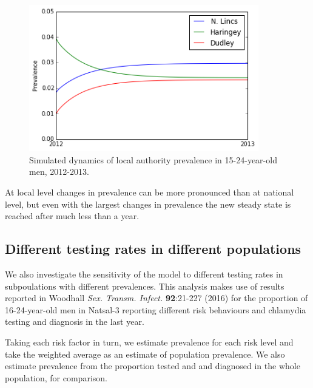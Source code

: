 \documentclass{article}
\begin{document}
    \begin{figure}
        \begin{center}\includegraphics[width=10cm]{three_compartment_model_files/three_compartment_model_22_1.png}\end{center}
        \caption{Simulated dynamics of local authority prevalence in 15-24-year-old men, 2012-2013.}
        \label{}
    \end{figure}
    
    At local level changes in prevalence can be more pronounced than at
national level, but even with the largest changes in prevalence the new
steady state is reached after much less than a year.

\subsection{Different testing rates in different
populations}\label{different-testing-rates-in-different-populations}

We also investigate the sensitivity of the model to different testing
rates in subpoulations with different prevalences. This analysis makes
use of results reported in Woodhall \emph{Sex. Transm. Infect.}
\textbf{92}:21-227 (2016) for the proportion of 16-24-year-old men in
Natsal-3 reporting different risk behaviours and chlamydia testing and
diagnosis in the last year.

Taking each risk factor in turn, we estimate prevalence for each risk
level and take the weighted average as an estimate of population
prevalence. We also estimate prevalence from the proportion tested and
and diagnosed in the whole population, for comparison.
\end{document}
